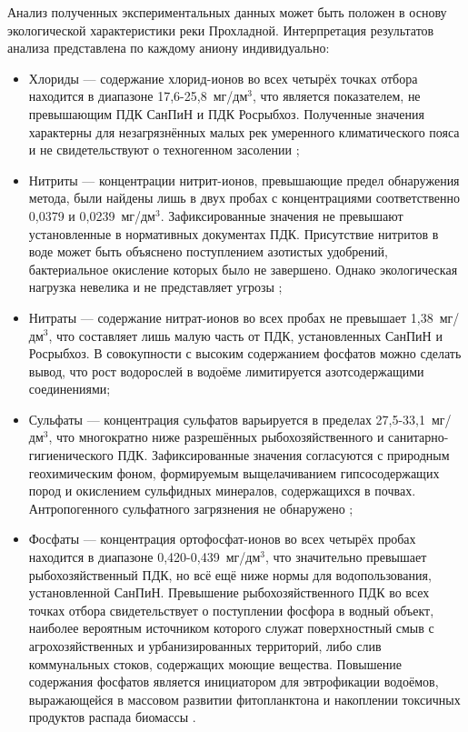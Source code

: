 Анализ полученных экспериментальных данных может быть положен в основу экологической характеристики реки Прохладной. Интерпретация результатов анализа представлена по каждому аниону индивидуально:

\begin{itemize}
  \item Хлориды — содержание хлорид-ионов во всех четырёх точках отбора находится в диапазоне 17,6-25,8~мг/дм$^3$, что является показателем, не превышающим ПДК СанПиН и ПДК Росрыбхоз. Полученные значения характерны для незагрязнённых малых рек умеренного климатического пояса и не свидетельствуют о техногенном засолении \cite{kaushalFreshwaterSalinizationSyndrome2021, wuReviewChlorideIon2021};
  \item Нитриты — концентрации нитрит-ионов, превышающие предел обнаружения метода, были найдены лишь в двух пробах с концентрациями соответственно 0,0379 и 0,0239~мг/дм$^3$. Зафиксированные значения не превышают установленные в нормативных документах ПДК. Присутствие нитритов в воде может быть объяснено поступлением азотистых удобрений, бактериальное окисление которых было не завершено. Однако экологическая нагрузка невелика и не представляет угрозы \cite{saalidongExaminingDynamicsRelationship2022};
  \item Нитраты — содержание нитрат-ионов во всех пробах не превышает 1,38~мг/дм$^3$, что составляет лишь малую часть от ПДК, установленных СанПиН и Росрыбхоз. В совокупности с высоким содержанием фосфатов можно сделать вывод, что рост водорослей в водоёме лимитируется азотсодержащими соединениями;
  \item Сульфаты — концентрация сульфатов варьируется в пределах 27,5-33,1~мг/дм$^3$, что многократно ниже разрешённых рыбохозяйственного и санитарно-гигиенического ПДК. Зафиксированные значения согласуются с природным геохимическим фоном, формируемым выщелачиванием гипсосодержащих пород и окислением сульфидных минералов, содержащихся в почвах. Антропогенного сульфатного загрязнения не обнаружено \cite{saalidongExaminingDynamicsRelationship2022};
  \item Фосфаты — концентрация ортофосфат-ионов во всех четырёх пробах находится в диапазоне 0,420-0,439~мг/дм$^3$, что значительно превышает рыбохозяйственный ПДК, но всё ещё ниже нормы для водопользования, установленной СанПиН. Превышение рыбохозяйственного ПДК во всех точках отбора свидетельствует о поступлении фосфора в водный объект, наиболее вероятным источником которого служат поверхностный смыв с агрохозяйственных и урбанизированных территорий, либо слив коммунальных стоков, содержащих моющие вещества. Повышение содержания фосфатов является инициатором для эвтрофикации водоёмов, выражающейся в массовом развитии фитопланктона и накоплении токсичных продуктов распада биомассы \cite{marinRelativeEffectsEutrophication2025, qinEutrophicationControlLarge2023}.
\end{itemize}

